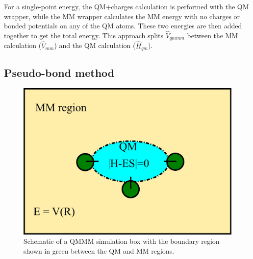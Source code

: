 \documentclass[12pt]{report}
\begin{document}
For a single-point energy, the QM+charges calculation is performed with the QM
wrapper, while the MM wrapper calculates the MM energy with no charges or
bonded potentials on any of the QM atoms. These two energies are then added
together to get the total energy. This approach splits $\hat V_{qmmm}$ between
the MM calculation ($\hat V_{mm}$) and the QM calculation ($\hat H_{qm}$). 

\FloatBarrier

\subsection{Pseudo-bond method}

\begin{figure}[hbt]
 \centering
 \includegraphics[scale=0.50]{../doc/images/QMMM_2.png}
 \caption{Schematic of a QMMM simulation box with the boundary region shown in
 green between the QM and MM regions.}
 \label{fig:QMMM2}
\end{figure} 
\end{document}
